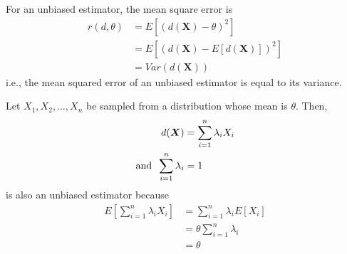 \documentclass[../probability-notes.tex]{subfiles}
\begin{document}
    For an unbiased estimator, the mean square error is
    \begin{align*}
        r(d, \theta) &= E[(d(\boldsymbol{X}) - \theta)^{2}]\\
        &= E[(d(\boldsymbol{X}) - E[d(\boldsymbol{X})])^{2}]\\
        &= Var(d(\boldsymbol{X}))
    \end{align*}
    i.e., the mean squared error of an unbiased estimator is equal to its variance.\newline

    Let $X_{1}, X_{2}, \ldots, X_{n}$ be sampled from a distribution whose mean is $\theta$. Then,
    \begin{align*}
        d(\boldsymbol{X}) &= \sum_{i=1}^{n} \lambda_{i} X_{i}\\
        \text{and \:} \sum_{i=1}^{n}\lambda_{i} &= 1
    \end{align*}
    is also an unbiased estimator because
    \begin{align*}
        E[\sum_{i=1}^{n} \lambda_{i} X_{i}] &= \sum_{i=1}^{n} \lambda_{i} E[X_{i}]\\
        &= \theta \sum_{i=1}^{n}\lambda_{i}\\
        &= \theta
    \end{align*}

    
\end{document}
